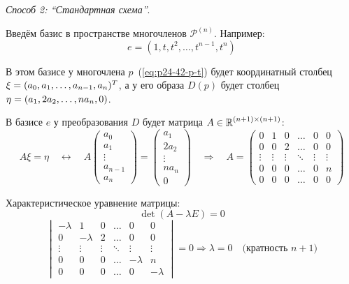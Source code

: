 \documentclass[a4paper,12pt]{article}
\begin{document}
\begin{solution}
    
    \emph{Способ 2: ``Стандартная схема''}.
    
    Введём базис в пространстве многочленов $\mathcal P^{(n)}$.
    Например:
    \[
      e = (1, t, t^2, \ldots, t^{n - 1}, t^n)
    \]
    
    В этом базисе у многочлена $p$~(\ref{eq:p24-42-p-t}) будет координатный столбец $\xi \hm= (a_0, a_1, \ldots, a_{n - 1}, a_n)^T$, а у его образа $D(p)$ будет столбец $\eta \hm= (a_1, 2 a_2, \ldots, n a_n, 0)$.
    
    В базисе $e$ у преобразования $D$ будет матрица $A \hm\in \RR^{(n + 1) \times (n + 1)}$:
    \[
      A \xi = \eta
      \quad\leftrightarrow\quad A \begin{pmatrix}
        a_0\\
        a_1\\
        \vdots\\
        a_{n - 1}\\
        a_n
      \end{pmatrix} = \begin{pmatrix}
        a_1\\
        2 a_2\\
        \vdots\\
        n a_n\\
        0
      \end{pmatrix}
      \quad\Rightarrow\quad A = \begin{pmatrix}
        0      & 1      & 0      & \ldots & 0      & 0\\
        0      & 0      & 2      & \ldots & 0      & 0\\
        \vdots & \vdots & \vdots & \ddots & \vdots & \vdots\\
        0      & 0      & 0      & \ldots & 0      & n\\
        0      & 0      & 0      & \ldots & 0      & 0
      \end{pmatrix}
    \]
    
    Характеристическое уравнение матрицы:
    \[
      \det(A - \lambda E) = 0
    \]
    \[
      \begin{vmatrix}
        -\lambda & 1        & 0      & \ldots & 0        & 0\\
        0        & -\lambda & 2      & \ldots & 0        & 0\\
        \vdots   & \vdots   & \vdots & \ddots & \vdots   & \vdots\\
        0        & 0        & 0      & \ldots & -\lambda & n\\
        0        & 0        & 0      & \ldots & 0        & -\lambda
      \end{vmatrix} = 0
      \Rightarrow \lambda = 0\quad \mbox{(кратность $n + 1$)}
    \]
    

\end{solution}
\end{document}
